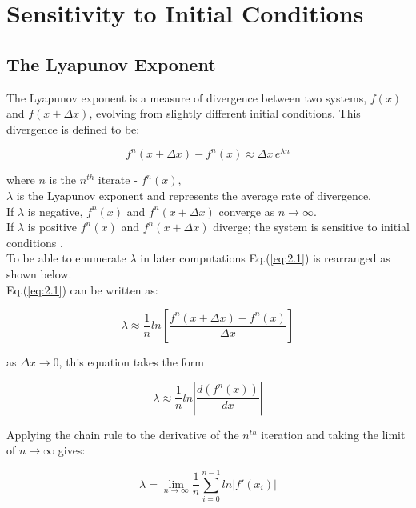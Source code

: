\section{Sensitivity to Initial Conditions}
\subsection{The Lyapunov Exponent}

The Lyapunov exponent is a measure of divergence between two 
systems, $f(x)$ and $f(x+\Delta x)$, evolving from slightly 
different initial conditions. This divergence is defined to be:

\begin{equation}
\label{eq:2.1}
    f^n (x+\Delta x) - f^n (x) \approx \Delta x\, e^{\lambda n}
\end{equation}

where $n$ is the $n^{th}$ iterate - $f^n (x)$,\\ 
$\lambda$ is the Lyapunov exponent and represents the average 
rate of divergence.\\
If $\lambda$ is negative, $f^n (x)$ and $f^n (x+\Delta x)$ 
converge as $n \to \infty$.\\
If $\lambda$ is positive 
$f^n (x)$ and $f^n (x+\Delta x)$ diverge; the system 
is sensitive to initial conditions \cite{baker}.\\
To be able to enumerate $\lambda$ in later computations 
Eq.(\eqref{eq:2.1}) is rearranged as shown below.\\
Eq.(\eqref{eq:2.1}) can be written as:

\begin{equation}
    \label{eq:2.2}
    \lambda \approx \frac{1}{n} ln \left[ \frac{f^n (x+\Delta x) - f^n (x)}{\Delta x} \right] 
\end{equation}

as $\Delta x \to 0$, this equation takes the form

\begin{equation}
    \lambda \approx \frac{1}{n} ln\left| \frac{d(f^n (x))}{d x} \right| 
\end{equation}
 


Applying the chain rule to the derivative of 
the $n^{th}$ iteration and taking the limit of $n \to \infty$ gives:

\begin{equation}
    \label{eq:2.3}
    \lambda = \lim_{n\to\infty} \frac{1}{n} \sum_{i=0}^{n-1} ln|f'(x_i)|
\end{equation}
